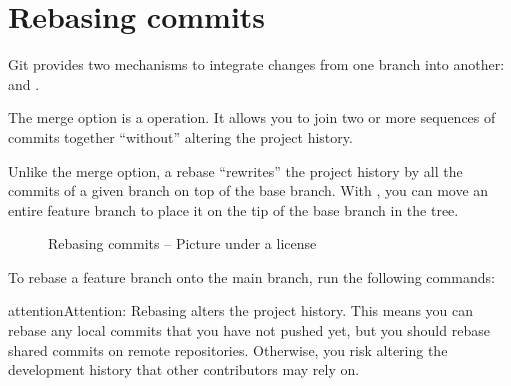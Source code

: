 \documentclass[a4paper,10pt,english,openany,oneside]{sphinxmanual}
\let\sphinxpxdimen\pdfpxdimen\else\newdimen\sphinxpxdimen
\begin{document}
\section{Rebasing commits}
\label{\detokenize{gitinminutes:rebasing-commits}}
\sphinxAtStartPar
Git provides two mechanisms to integrate changes from one branch into another:  and .

\sphinxAtStartPar
The merge option is a  operation. It allows you to join two or more sequences of commits together “without” altering the project history.

\sphinxAtStartPar
Unlike the merge option, a rebase “rewrites” the project history by  all the commits of a given branch on top of the base branch. With , you can move an entire feature branch to place it on the tip of the base branch in the tree.

\begin{figure}[H]
\centering
\capstart

\noindent\sphinxincludegraphics[width=800\sphinxpxdimen,height=544\sphinxpxdimen]{{git-rebase}.pdf}
\caption{Rebasing commits – Picture under a \sphinxfootnotemark[8] license}\label{\detokenize{gitinminutes:id2}}\end{figure}
%
\begin{footnotetext}[8]\sphinxAtStartFootnote
{}
%
\end{footnotetext}\ignorespaces 
\sphinxAtStartPar
To rebase a feature branch onto the main branch, run the following commands:

\begin{sphinxVerbatim}[commandchars=\\\{\}]
  

  
\end{sphinxVerbatim}

\begin{sphinxadmonition}{attention}{Attention:}
\sphinxAtStartPar
Rebasing alters the project history. This means you can rebase any local commits that you have not pushed yet, but you should  rebase shared commits on remote repositories. Otherwise, you risk altering the development history that other contributors may rely on.
\end{sphinxadmonition}
\end{document}
